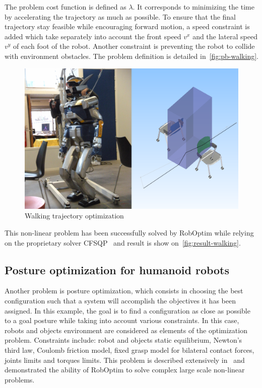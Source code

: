 \documentclass[conference,final,a4paper,twocolumn,9pt]{IEEEtran}
\begin{document}
The problem cost function is defined as $\lambda$. It corresponds to
minimizing the time by accelerating the trajectory as much as
possible. To ensure that the final trajectory stay feasible while
encouraging forward motion, a speed constraint is added which take
separately into account the front speed $v^x$ and the lateral speed
$v^y$ of each foot of the robot. Another constraint is preventing the
robot to collide with environment obstacles. The problem definition is
detailed in~\autoref{fig:pb-walking}.


\begin{figure}[ht!]
  \begin{center}
    \includegraphics[width=\linewidth]{hrp2-two-chairs.png}
    \caption{Walking trajectory optimization\label{fig:result-walking}}
  \end{center}
\end{figure}


This non-linear problem has been successfully solved by RobOptim while
relying on the proprietary solver CFSQP~\cite{cfsqp} and result is
show on~\autoref{fig:result-walking}.


\subsection{Posture optimization for humanoid robots}


Another problem is posture optimization, which consists in choosing
the best configuration such that a system will accomplish the
objectives it has been assigned. In this example, the goal is to find
a configuration as close as possible to a goal posture while taking
into account various constraints. In this case, robots and objects
environment are considered as elements of the optimization
problem. Constraints include: robot and objects static equilibrium,
Newton's third law, Coulomb friction model, fixed grasp model for
bilateral contact forces, joints limits and torques limits. This
problem is described extensively
in~\cite{Bouyarmane2011a,Bouyarmane2010} and demonstrated the ability
of RobOptim to solve complex large scale non-linear problems.
\end{document}
